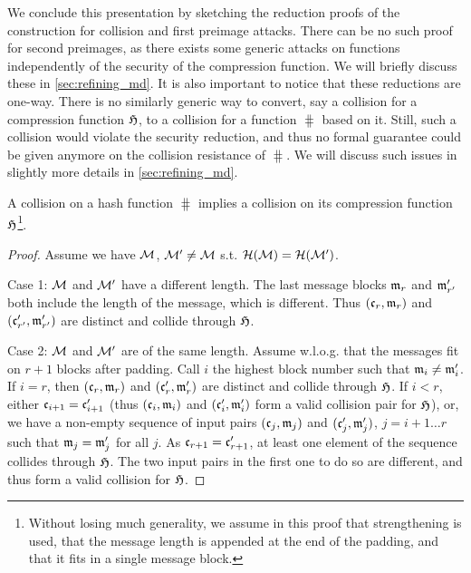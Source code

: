 We conclude this presentation by sketching the reduction proofs of the construction for collision and first preimage attacks. There can be no such proof
for second preimages, as there exists some generic attacks on \merkdam functions independently of the security of the compression function. We will
briefly discuss these in \autoref{sec:refining_md}.
It is also important to notice that these reductions are one-way. There is no similarly generic way to convert, say a collision for a compression function $\operatorname{\mathfrak{H}}$,
to a collision for a \merkdam function $\hash$ based on it. Still, such a collision would violate the security reduction, and thus no formal guarantee could be given
anymore on the collision resistance of $\hash$. We will discuss such issues in slightly more details in \autoref{sec:refining_md}.

\begin{prop}
A collision on a \merkdam hash function $\hash$ implies a collision on its compression function $\operatorname{\mathfrak{H}}$\footnote{Without losing much generality, we assume in this proof
that \merkdam strengthening is used, that the message length is appended at the end of the padding, and that it fits in a single message block.}.
\end{prop}
\begin{proof}
Assume we have $\mathcal{M}$, $\mathcal{M}' \neq \mathcal{M}$ s.t. $\operatorname{\mathcal{H}}(\mathcal{M}) = \operatorname{\mathcal{H}}(\mathcal{M}')$.

Case 1: $\mathcal{M}$ and $\mathcal{M}'$ have a different length.
The last message blocks $\mathfrak{m}_r$ and $\mathfrak{m}'_{r'}$ both include the length
of the message, which is different. Thus $(\mathfrak{c}_r,\mathfrak{m}_r)$ and $(\mathfrak{c}'_{r'}, \mathfrak{m}'_{r'})$ are distinct and collide through $\operatorname{\mathfrak{H}}$.

Case 2: $\mathcal{M}$ and $\mathcal{M}'$ are of the same length. Assume w.l.o.g. that the messages fit on $r + 1$ blocks after padding.
Call $i$ the highest block number such that $\mathfrak{m}_{i} \neq \mathfrak{m}'_{i}$. If $i = r$, then $(\mathfrak{c}_r,\mathfrak{m}_r)$ and $(\mathfrak{c}'_{r}, \mathfrak{m}'_{r})$
are distinct and collide through $\operatorname{\mathfrak{H}}$. If $i < r$, either $\mathfrak{c}_{i+1} = \mathfrak{c}'_{i+1}$ (thus $(\mathfrak{c}_i,\mathfrak{m}_i)$ and $(\mathfrak{c}'_{i}, \mathfrak{m}'_{i})$
form a valid collision pair for $\operatorname{\mathfrak{H}}$), or, we have a non-empty sequence of input pairs $(\mathfrak{c}_j, \mathfrak{m}_j)$ and $(\mathfrak{c}'_j, \mathfrak{m}'_j)$,
$j = i+1\ldots r$ such that $\mathfrak{m}_j = \mathfrak{m}'_j$ for all $j$. As $\mathfrak{c}_{r+1} = \mathfrak{c}'_{r+1}$, at least one element of the sequence
collides through $\operatorname{\mathfrak{H}}$. The two input pairs in the first one to do so are different, and thus form a valid collision for $\operatorname{\mathfrak{H}}$.
\end{proof}


